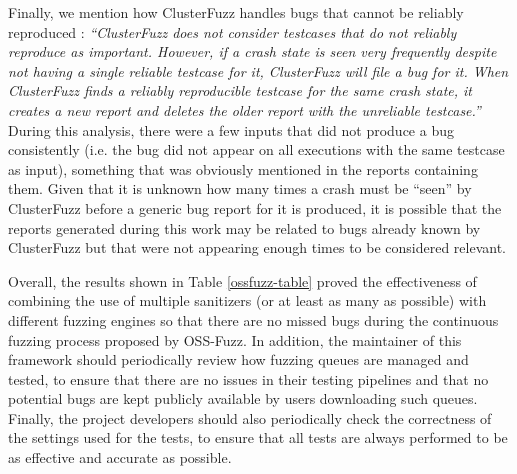 Finally, we mention how ClusterFuzz handles bugs that cannot be reliably reproduced \cite{unreliable}: \textit{``ClusterFuzz does not consider testcases that do not reliably reproduce as important. However, if a crash state is seen very frequently despite not having a single reliable testcase for it, ClusterFuzz will file a bug for it. When ClusterFuzz finds a reliably reproducible testcase for the same crash state, it creates a new report and deletes the older report with the unreliable testcase.''} During this analysis, there were a few inputs that did not produce a bug consistently (i.e. the bug did not appear on all executions with the same testcase as input), something that was obviously mentioned in the reports containing them. Given that it is unknown how many times a crash must be ``seen'' by ClusterFuzz before a generic bug report for it is produced, it is possible that the reports generated during this work may be related to bugs already known by ClusterFuzz but that were not appearing enough times to be considered relevant.

Overall, the results shown in Table \ref{ossfuzz-table} proved the effectiveness of combining the use of multiple sanitizers (or at least as many as possible) with different fuzzing engines so that there are no missed bugs during the continuous fuzzing process proposed by OSS-Fuzz. In addition, the maintainer of this framework should periodically review how fuzzing queues are managed and tested, to ensure that there are no issues in their testing pipelines and that no potential bugs are kept publicly available by users downloading such queues. Finally, the project developers should also periodically check the correctness of the settings used for the tests, to ensure that all tests are always performed to be as effective and accurate as possible.  

